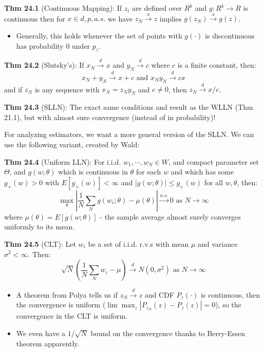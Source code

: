 \documentclass[12pt]{article} %
\begin{document}
\textbf{Thm 24.1} (Continuous Mapping): If $z_i$ are defined over $R^k$ and $g:R^k \rightarrow R$ is continuous then for $x \in d,p,a.s.$ we have $z_N \xrightarrow{x} z$ implies $g(z_N) \xrightarrow{x} g(z)$.
\begin{itemize}[topsep=-1pt, itemsep=-1pt]
    \item 
Generally, this holds whenever the set of points with $g(\cdot)$ is discontinuous has probability $0$ under $p_z$.
\end{itemize}

\textbf{Thm 24.2} (Slutsky's): If $x_N \xrightarrow{d} x$ and $y_N \xrightarrow{d} c$ where $c$ is a finite constant, then:
\begin{equation*}
    x_N + y_N \xrightarrow{d} x + c \text{ and } x_Ny_N \xrightarrow{d} cx
\end{equation*}
and if $z_N$ is any sequence with $x_N = z_N y_N$ and $c \neq 0$, then $z_N \xrightarrow{d} x/c$.

\textbf{Thm 24.3} (SLLN): The exact same conditions and result as the WLLN (Thm 21.1), but with almost sure convergence (instead of in probability)!


For analyzing estimators, we want a more general version of the SLLN. We can use the following variant, created by Wald:

\textbf{Thm 24.4} (Uniform LLN): For i.i.d. $w_1, \cdots, w_N \in W$, and compact parameter set $\Theta$, and $g(w;\theta)$ which is continuous in $\theta$ for each $w$ and which has some $g_+(w) > 0$ with $E[g_+(w)] < \infty$ and $|g(w;\theta)| \leq g_+(w)$ for all $w, \theta$, then:
\begin{equation*}
    \max_\theta 
    \left| 
    \frac{1}{N}
    \sum_N g(w_i;\theta) - \mu(\theta)
    \right|
    \xrightarrow{a.s.} 0 \text{ as } N \rightarrow \infty
\end{equation*}
where $\mu(\theta) = E[g(w;\theta)]$ - the sample average almost surely converges uniformly to its mean.


\textbf{Thm 24.5} (CLT): Let $w_i$ be a set of i.i.d. r.v.s with mean $\mu$ and variance $\sigma^2 < \infty$. Then:
\begin{equation*}
    \sqrt{N}
    \left(
    \frac{1}{N}
    \sum_N w_i - \mu
    \right)
    \xrightarrow{d} N(0, \sigma^2) \text{ as } N \rightarrow \infty
\end{equation*}
\begin{itemize}[topsep=-1pt, itemsep=-1pt]
    \item 
A theorem from Polya tells us if $z_N \xrightarrow{d} z$ and CDF $P_z(\cdot)$ is continuous, then the convergence is uniform ($\lim \max_z |P_{z_N}(z) - P_z(z)| = 0$), so the convergence in the CLT is uniform.
    \item 
We even have a $1 / \sqrt{N}$ bound on the convergence thanks to Berry-Essen theorem apparently.
\end{itemize}
\end{document}
